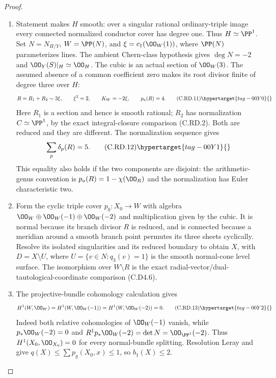 \begin{proof}

\begin{enumerate}[label={$\langle1\rangle$\arabic*.},leftmargin=*]
\item Statement  makes $H$ smooth: over a singular
rational ordinary-triple image every connected normalized
conductor cover has degree one. Thus $H\simeq\PP^1$.
Set $N=N_{H/Y}$, $W=\PP(N)$, and
$\xi=c_1(\OO_W(1))$, where $\PP(N)$ parameterizes lines.
The ambient Chern-class hypothesis gives
$\deg N=-2$ and $\OO_Y(S)|_H\simeq\OO_H$.
The cubic is an actual section of $\OO_W(3)$.
The assumed absence of a common coefficient zero makes
its root divisor finite of degree three over $H$:
\[
 R=R_1+R_2\sim3\xi,\qquad
 \xi^2=2,\qquad K_W=-2\xi,\qquad p_a(R)=4.
\tag{C.RD.11}\hypertarget{tag-00Y0}{}\label{cdp:eq:C.RD.11}
\]
Here $R_1$ is a section and hence is smooth rational;
$R_2$ has normalization $C\simeq\PP^1$, by the exact
integral-closure comparison (C.RD.2). Both are reduced
and they are different. The normalization sequence gives
\[
                  \sum_p\delta_p(R)=5.
\tag{C.RD.12}\hypertarget{tag-00Y1}{}\label{cdp:eq:C.RD.12}
\]
This equality also holds if the two components are
disjoint: the arithmetic-genus convention is
$p_a(R)=1-\chi(\OO_R)$ and the normalization has Euler
characteristic two.

\item Form the cyclic triple cover
$p_0:X_0\to W$ with algebra
$\OO_W\oplus\OO_W(-1)\oplus\OO_W(-2)$ and multiplication
given by the cubic. It is normal because its branch
divisor $R$ is reduced, and is connected because a
meridian around a smooth branch point permutes its
three sheets cyclically. Resolve its isolated
singularities and its reduced boundary to obtain
$X$, with $D=X\setminus U$, where
$U=\{v\in N:q_3(v)=1\}$ is the smooth normal-cone
level surface. The isomorphism over $W\setminus R$
is the exact radial-vector/dual-tautological-coordinate
comparison (C.D4.6).

\item The projective-bundle cohomology calculation gives
\[
 H^1(W,\OO_W)=H^1(W,\OO_W(-1))
             =H^1(W,\OO_W(-2))=0.
\tag{C.RD.13}\hypertarget{tag-00Y2}{}\label{cdp:eq:C.RD.13}
\]
Indeed both relative cohomologies of $\OO_W(-1)$
vanish, while $p_*\OO_W(-2)=0$ and
$R^1p_*\OO_W(-2)=\det N=\OO_{\PP^1}(-2)$.
Thus $H^1(X_0,\OO_{X_0})=0$ for every normal-bundle
splitting. Resolution Leray and  give
$q(X)\le\sum p_g(X_0,x)\le1$, so $b_1(X)\le2$.


\end{enumerate}
\end{proof}
